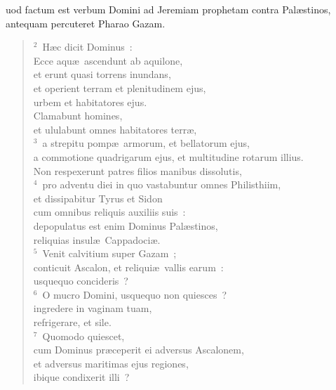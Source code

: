 \bchapter
{}uod factum est verbum Domini ad Jeremiam prophetam contra Pal\ae stinos, antequam percuteret Pharao Gazam.
\begin{verse}${}^{2}$~H\ae c dicit Dominus~:\\ Ecce aqu\ae\ ascendunt ab aquilone,\\ et erunt quasi torrens inundans,\\ et operient terram et plenitudinem ejus,\\ urbem et habitatores ejus.\\ Clamabunt homines,\\ et ululabunt omnes habitatores terr\ae ,\\
${}^{3}$~a strepitu pomp\ae\ armorum, et bellatorum ejus,\\ a commotione quadrigarum ejus, et multitudine rotarum illius.\\ Non respexerunt patres filios manibus dissolutis,\\
${}^{4}$~pro adventu diei in quo vastabuntur omnes Philisthiim,\\ et dissipabitur Tyrus et Sidon\\ cum omnibus reliquis auxiliis suis~:\\ depopulatus est enim Dominus Pal\ae stinos,\\ reliquias insul\ae\ Cappadoci\ae .\\
${}^{5}$~Venit calvitium super Gazam~;\\ conticuit Ascalon, et reliqui\ae\ vallis earum~:\\ usquequo concideris~?\\
${}^{6}$~O mucro Domini, usquequo non quiesces~?\\ ingredere in vaginam tuam,\\ refrigerare, et sile.\\
${}^{7}$~Quomodo quiescet,\\ cum Dominus pr\ae ceperit ei adversus Ascalonem,\\ et adversus maritimas ejus regiones,\\ ibique condixerit illi~?\end{verse}



